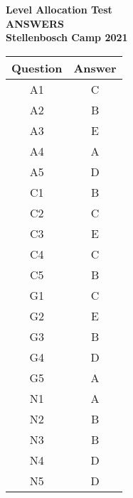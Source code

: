 \documentclass{article}
\begin{document}
\thispagestyle{empty}

\begin{center}
  \textbf{\Large Level Allocation Test}
  \\ \vspace{1em}
  \textbf{\Large ANSWERS}
  \\ \vspace{1em}
  \textbf{\large Stellenbosch Camp 2021}
\end{center}

\vspace{24pt}
\begin{table}[!htb]
    \centering
    \begin{tabular}{| c | c |}
        \hline
        Question & Answer \\
        \hline 
        A1 & C\\
        A2 & B\\
        A3 & E\\
        A4 & A\\
        A5 & D\\
        \hline
        C1 & B\\
        C2 & C\\
        C3 & E\\
        C4 & C\\
        C5 & B\\
        \hline
        G1 & C\\
        G2 & E\\
        G3 & B\\
        G4 & D\\
        G5 & A\\
        \hline
        N1 & A\\
        N2 & B\\
        N3 & B\\
        N4 & D\\
        N5 & D\\ 
        \hline
    \end{tabular}
\end{table}
\end{document}

